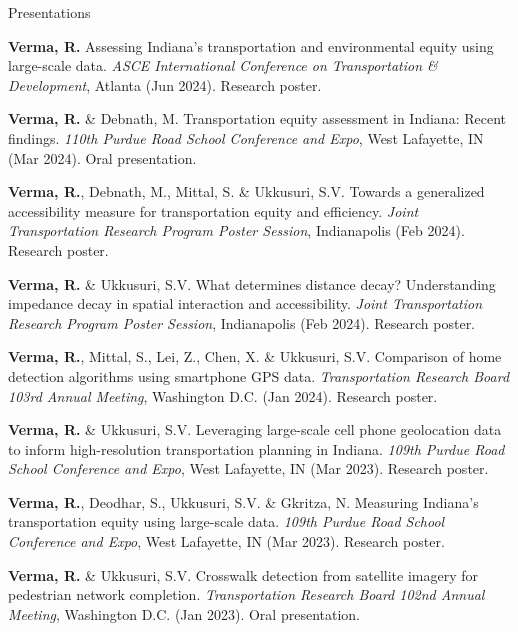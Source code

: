 \documentclass{CV} %
\begin{document}
\begin{rSection}{Presentations}
    \begin{etaremune}
        
        \item \textbf{Verma, R.} Assessing Indiana's transportation and environmental equity using large-scale data. \textit{ASCE International Conference on Transportation \& Development}, Atlanta (Jun 2024). Research poster.

        \item \textbf{Verma, R.} \& Debnath, M. Transportation equity assessment in Indiana: Recent findings. \textit{110th Purdue Road School Conference and Expo}, West Lafayette, IN (Mar 2024). Oral presentation.
        
        \item \textbf{Verma, R.}, Debnath, M., Mittal, S. \& Ukkusuri, S.V. Towards a generalized accessibility measure for transportation equity and efficiency. \textit{Joint Transportation Research Program Poster Session}, Indianapolis (Feb 2024). Research poster.
        
        \item \textbf{Verma, R.} \& Ukkusuri, S.V. What determines distance decay? Understanding impedance decay in spatial interaction and accessibility. \textit{Joint Transportation Research Program Poster Session}, Indianapolis (Feb 2024). Research poster.

        \item \textbf{Verma, R.}, Mittal, S., Lei, Z., Chen, X. \& Ukkusuri, S.V. Comparison of home detection algorithms using smartphone GPS data. \textit{Transportation Research Board 103rd Annual Meeting}, Washington D.C. (Jan 2024). Research poster.

        \item \textbf{Verma, R.} \& Ukkusuri, S.V. Leveraging large-scale cell phone geolocation data to inform high-resolution transportation planning in Indiana. \textit{109th Purdue Road School Conference and Expo}, West Lafayette, IN (Mar 2023). Research poster.

        \item \textbf{Verma, R.}, Deodhar, S., Ukkusuri, S.V. \& Gkritza, N. Measuring Indiana's transportation equity using large-scale data. \textit{109th Purdue Road School Conference and Expo}, West Lafayette, IN (Mar 2023). Research poster.

        \item \textbf{Verma, R.} \& Ukkusuri, S.V. Crosswalk detection from satellite imagery for pedestrian network completion. \textit{Transportation Research Board 102nd Annual Meeting}, Washington D.C. (Jan 2023). Oral presentation.


\end{etaremune}
\end{rSection}
\end{document}
